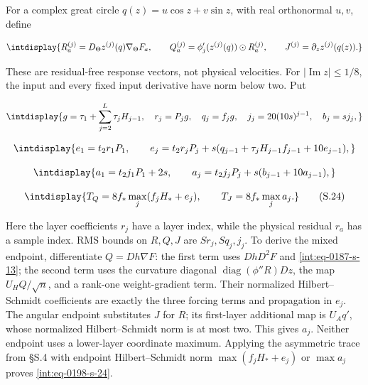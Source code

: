 For a complex great circle \(q(z)=u\cos z+v\sin z\), with real orthonormal \(u,\allowbreak v\), define


\begingroup\renewcommand{\theHequation}{intdisplay.399}
\begin{equation*}
\intdisplay{
R_a^{(j)}=D_\Theta z^{(j)}(q)\nabla_\Theta F_a,
\qquad Q_a^{(j)}=\phi_j'(z^{(j)}(q))\odot R_a^{(j)},
\qquad J^{(j)}=\partial_z z^{(j)}(q(z)).
}
\end{equation*}
\endgroup


These are residual-free response vectors, not physical velocities. For \(|\operatorname{Im}z|\le1/8\), the input and every fixed input derivative have norm below two. Put


\begingroup\renewcommand{\theHequation}{intdisplay.400}
\begin{equation*}
\intdisplay{
g=\tau_1+\sum_{j=2}^L\tau_jH_{j-1},\quad
r_j=P_jg,\quad q_j=f_jg,\quad j_j=20(10s)^{j-1},\quad b_j=sj_j,
}
\end{equation*}
\endgroup

\begingroup\renewcommand{\theHequation}{intdisplay.401}
\begin{equation*}
\intdisplay{
e_1=t_2r_1P_1,\qquad
e_j=t_2r_jP_j+s(q_{j-1}+\tau_jH_{j-1}f_{j-1}+10e_{j-1}),
}
\end{equation*}
\endgroup

\begingroup\renewcommand{\theHequation}{intdisplay.402}
\begin{equation*}
\intdisplay{
a_1=t_2j_1P_1+2s,\qquad
a_j=t_2j_jP_j+s(b_{j-1}+10a_{j-1}),
}
\end{equation*}
\endgroup

\begingroup\renewcommand{\theHequation}{intdisplay.403}
\begin{equation}
\intdisplay{
T_Q=8f_*\max_j(f_jH_*+e_j),\qquad T_J=8f_*\max_ja_j.
}
\tag{S.24}
\label{int:eq-0198-s-24}
\end{equation}
\endgroup


Here the layer coefficients \(r_j\) have a layer index, while the physical residual \(r_a\) has a sample index. RMS bounds on \(R,\allowbreak Q,\allowbreak J\) are \(Sr_j,\allowbreak Sq_j,\allowbreak j_j\). To derive the mixed endpoint, differentiate \(Q=Dh\nabla F\): the first term uses \(DhD^2F\) and \eqref{int:eq-0187-s-13}; the second term uses the curvature diagonal \(\operatorname{diag}(\phi''R)Dz\), the map \(U_HQ/\sqrt n\), and a rank-one weight-gradient term. Their normalized Hilbert--Schmidt coefficients are exactly the three forcing terms and propagation in \(e_j\). The angular endpoint substitutes \(J\) for \(R\); its first-layer additional map is \(U_Aq'\), whose normalized Hilbert--Schmidt norm is at most two. This gives \(a_j\). Neither endpoint uses a lower-layer coordinate maximum. Applying the asymmetric trace from §S.4 with endpoint Hilbert--Schmidt norm \(\max(f_jH_*+e_j)\) or \(\max a_j\) proves \eqref{int:eq-0198-s-24}.



